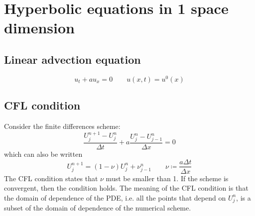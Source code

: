 \documentclass[12pt, openany]{report}
\theoremstyle{definition}
\begin{document}
\section{Hyperbolic equations in 1 space dimension}
\subsection{Linear advection equation}
\begin{equation}
	u_t + au_x = 0 \qquad u(x,t)=u^0(x)
\end{equation}
\subsection{CFL condition}
Consider the finite differences scheme:
\begin{equation}
	\frac{U_j^{n+1}-U_j^n}{\Delta t} + a \frac{U_j^n-U_{j-1}^n}{\Delta x} = 0
\end{equation}
which can also be written 
\begin{equation}
	U_j^{n+1} = (1-\nu)U_j^n + \nu_{j-1}^n\qquad \nu \coloneqq \frac{a\Delta t}{\Delta x}
\end{equation}
The CFL condition states that $\nu$ must be smaller than 1. If the scheme is convergent, then the condition holds. The meaning of the CFL condition is that the domain of dependence of the PDE, i.e. all the points that depend on $U_j^n$, is a subset of the domain of dependence of the numerical scheme. 
\end{document}
